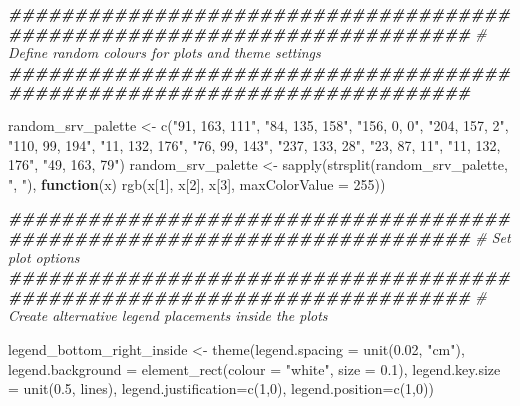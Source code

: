 \documentclass[
]{book}
\newenvironment{Shaded}{\begin{snugshade}}{\end{snugshade}}
\newcommand{\AttributeTok}[1]{\textcolor[rgb]{0.77,0.63,0.00}{#1}}
\newcommand{\CommentTok}[1]{\textcolor[rgb]{0.56,0.35,0.01}{\textit{#1}}}
\newcommand{\ControlFlowTok}[1]{\textcolor[rgb]{0.13,0.29,0.53}{\textbf{#1}}}
\newcommand{\DecValTok}[1]{\textcolor[rgb]{0.00,0.00,0.81}{#1}}
\newcommand{\DocumentationTok}[1]{\textcolor[rgb]{0.56,0.35,0.01}{\textbf{\textit{#1}}}}
\newcommand{\FloatTok}[1]{\textcolor[rgb]{0.00,0.00,0.81}{#1}}
\newcommand{\FunctionTok}[1]{\textcolor[rgb]{0.00,0.00,0.00}{#1}}
\newcommand{\NormalTok}[1]{#1}
\newcommand{\OtherTok}[1]{\textcolor[rgb]{0.56,0.35,0.01}{#1}}
\newcommand{\StringTok}[1]{\textcolor[rgb]{0.31,0.60,0.02}{#1}}
\begin{document}
\begin{Shaded}
\begin{Highlighting}[]
\DocumentationTok{\#\#\#\#\#\#\#\#\#\#\#\#\#\#\#\#\#\#\#\#\#\#\#\#\#\#\#\#\#\#\#\#\#\#\#\#\#\#\#\#\#\#\#\#\#\#\#\#\#\#\#\#\#\#\#\#\#\#\#\#\#\#\#\#\#\#\#\#\#\#\#\#\#}
\CommentTok{\# Define random colours for plots and theme settings}
\DocumentationTok{\#\#\#\#\#\#\#\#\#\#\#\#\#\#\#\#\#\#\#\#\#\#\#\#\#\#\#\#\#\#\#\#\#\#\#\#\#\#\#\#\#\#\#\#\#\#\#\#\#\#\#\#\#\#\#\#\#\#\#\#\#\#\#\#\#\#\#\#\#\#\#\#\#}

\NormalTok{random\_srv\_palette }\OtherTok{\textless{}{-}} \FunctionTok{c}\NormalTok{(}\StringTok{"91, 163, 111"}\NormalTok{,}
                        \StringTok{"84, 135, 158"}\NormalTok{,}
                        \StringTok{"156, 0, 0"}\NormalTok{,}
                        \StringTok{"204, 157, 2"}\NormalTok{,}
                        \StringTok{"110, 99, 194"}\NormalTok{,}
                        \StringTok{"11, 132, 176"}\NormalTok{,}
                        \StringTok{"76, 99, 143"}\NormalTok{,}
                        \StringTok{"237, 133, 28"}\NormalTok{,}
                        \StringTok{"23, 87, 11"}\NormalTok{,}
                        \StringTok{"11, 132, 176"}\NormalTok{,}
                        \StringTok{"49, 163, 79"}\NormalTok{)}
\NormalTok{random\_srv\_palette }\OtherTok{\textless{}{-}} \FunctionTok{sapply}\NormalTok{(}\FunctionTok{strsplit}\NormalTok{(random\_srv\_palette, }\StringTok{", "}\NormalTok{), }\ControlFlowTok{function}\NormalTok{(x)}
    \FunctionTok{rgb}\NormalTok{(x[}\DecValTok{1}\NormalTok{], x[}\DecValTok{2}\NormalTok{], x[}\DecValTok{3}\NormalTok{], }\AttributeTok{maxColorValue =} \DecValTok{255}\NormalTok{))}

\DocumentationTok{\#\#\#\#\#\#\#\#\#\#\#\#\#\#\#\#\#\#\#\#\#\#\#\#\#\#\#\#\#\#\#\#\#\#\#\#\#\#\#\#\#\#\#\#\#\#\#\#\#\#\#\#\#\#\#\#\#\#\#\#\#\#\#\#\#\#\#\#\#\#\#\#\#}
\CommentTok{\# Set plot options}
\DocumentationTok{\#\#\#\#\#\#\#\#\#\#\#\#\#\#\#\#\#\#\#\#\#\#\#\#\#\#\#\#\#\#\#\#\#\#\#\#\#\#\#\#\#\#\#\#\#\#\#\#\#\#\#\#\#\#\#\#\#\#\#\#\#\#\#\#\#\#\#\#\#\#\#\#\#}
\CommentTok{\# Create alternative legend placements inside the plots}

\NormalTok{legend\_bottom\_right\_inside }\OtherTok{\textless{}{-}} \FunctionTok{theme}\NormalTok{(}\AttributeTok{legend.spacing =} \FunctionTok{unit}\NormalTok{(}\FloatTok{0.02}\NormalTok{, }\StringTok{"cm"}\NormalTok{),}
                                    \AttributeTok{legend.background =} \FunctionTok{element\_rect}\NormalTok{(}\AttributeTok{colour =} \StringTok{"white"}\NormalTok{, }\AttributeTok{size =} \FloatTok{0.1}\NormalTok{),}
                                    \AttributeTok{legend.key.size =} \FunctionTok{unit}\NormalTok{(}\FloatTok{0.5}\NormalTok{, }\StringTok{\textquotesingle{}lines\textquotesingle{}}\NormalTok{),}
                                    \AttributeTok{legend.justification=}\FunctionTok{c}\NormalTok{(}\DecValTok{1}\NormalTok{,}\DecValTok{0}\NormalTok{), }
                                    \AttributeTok{legend.position=}\FunctionTok{c}\NormalTok{(}\DecValTok{1}\NormalTok{,}\DecValTok{0}\NormalTok{))}


\end{Highlighting}
\end{Shaded}
\end{document}
